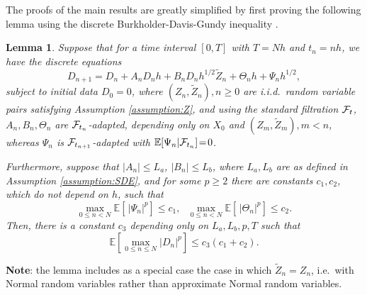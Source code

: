 \documentclass[11pt]{article}
\def \EE {{\mathbb{E}}}
\def \tZ {{\widetilde{Z}}}
\newtheorem{lemma}[theorem]{Lemma}
\begin{document}
The proofs of the main results are greatly simplified by first proving 
the following lemma using the discrete Burkholder-Davis-Gundy 
inequality \cite{bdg72}.

\begin{lemma}
\label{lemma:key}
Suppose that for a time interval $[0,T]$ with $T {=} Nh$ and $t_n {=} nh$, 
we have the discrete equations
\[
D_{n+1} = D_n + A_n D_n h + B_n D_n h^{1/2} \tZ_n + \Theta_n h + \Psi_n h^{1/2},
\]
subject to initial data $D_0\!=\!0$, where $(Z_n,\tZ_n), n{\geq}0$
are i.i.d.~random variable pairs satisfying Assumption \ref{assumption:Z},
and using the standard filtration ${\cal F}_t$, 
$A_n, B_n, \Theta_n$ are ${\cal F}_{t_n}$-adapted, depending only
on $X_0$ and $(Z_m,\tZ_m), m{<}n$, whereas 
$\Psi_n$ is ${\cal F}_{t_{n+1}}$-adapted
with $\EE[\Psi_n | {\cal F}_{t_n}] \!=\! 0$.

Furthermore, suppose that $|A_n| \!\leq\! L_a$, $|B_n| \!\leq\! L_b$, 
where $L_a, L_b$ are as defined in Assumption \ref{assumption:SDE}, 
and for some $p\!\geq\! 2$ there are constants $c_1, c_2$, which do not 
depend on $h$, such that
\[
\max_{0\leq n < N} \EE[\, |\Psi_n|^p ] \leq c_1,~~~
\max_{0\leq n < N} \EE[\, |\Theta_n|^p ] \leq c_2.
\]
Then, there is a constant $c_3$ depending only on 
$L_a, L_b, p, T$ such that
\[
\EE \left[ \max_{0\leq n \leq N} |D_n|^p \right] \leq c_3 (c_1 {+} c_2).
\]
\end{lemma}

\noindent
{\bf Note}: the lemma includes as a special case the case in which
$\tZ_n \!=\! Z_n$, i.e.~with Normal random variables rather than approximate 
Normal random variables.
\end{document}
